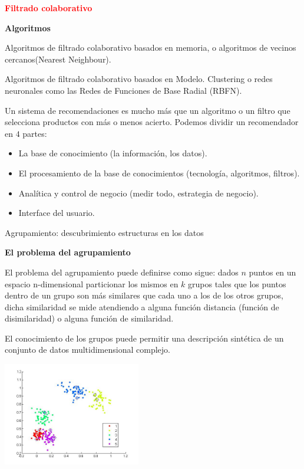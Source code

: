 \documentclass[11pt]{beamer}
\begin{document}
\begin{frame}{\textbf{\textcolor{red}{Filtrado colaborativo }}}

\textbf{Algoritmos}

\begin{itemize}
	\scriptsize{
	\item Algoritmos de filtrado colaborativo basados en memoria, o algoritmos de vecinos cercanos(Nearest Neighbour).
}
\scriptsize{
\item Algoritmos de filtrado colaborativo basados en Modelo. Clustering o redes neuronales como las Redes de Funciones de Base Radial (RBFN).}
\end{itemize}

\vspace{0.2cm}

\scriptsize{Un sistema de recomendaciones es mucho m\'as que un algoritmo o un filtro que selecciona productos con m\'as o menos acierto. Podemos dividir un recomendador en $4$ partes: }

\begin{itemize}
	\item La base de conocimiento (la informaci\'on, los datos).
	\item El procesamiento de la base de conocimientos (tecnolog\'ia, algoritmos, filtros).
	\item Anal\'itica y control de negocio (medir todo, estrategia de negocio).
	\item Interface del usuario.
\end{itemize}	
	
\end{frame}

\begin{frame}{Agrupamiento: descubrimiento estructuras en los datos}

\textbf{El problema del agrupamiento}

\scriptsize{El  problema  del  agrupamiento  puede  definirse  como  sigue:  dados  $n$  puntos  en  un   espacio  n-dimensional   particionar  los  mismos  en  $k$  grupos  tales  que  los  puntos  dentro de un grupo son m\'as similares que cada uno a los de los otros grupos, dicha similaridad   se   mide   atendiendo   a   alguna   funci\'on   distancia   (funci\'on   de   disimilaridad) o alguna funci\'on de similaridad.
	
El conocimiento de los grupos puede permitir una descripci\'on sint\'etica de un conjunto de datos multidimensional complejo.

\vspace{0.2cm}

\begin{center}
	\includegraphics[width=0.45\textwidth]{ML12.png}	
\end{center}	
} 
\end{frame}
\end{document}
